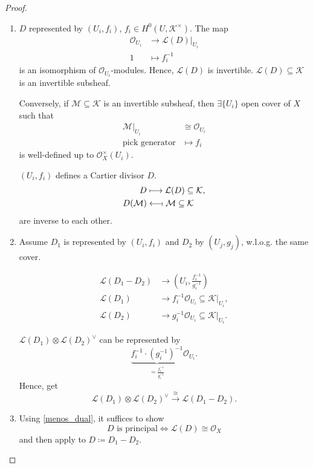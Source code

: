 \documentclass[12pt]{article}
\theoremstyle{definition}
\begin{document}
\begin{proof}
\begin{enumerate}[label=\roman*)]
\item $D$ represented by $(U_i,f_i)$, $f_i\in H^0(U,\mathcal K^\times)$. The map
\begin{align*}
\mathcal O_{U_i}&\longrightarrow\mathcal L(D)|_{U_i}\\1&\longmapsto f_i^{-1}
\end{align*}
is an isomorphism of $\mathcal O_{U_i}$-modules. Hence, $\mathcal L(D)$ is invertible. $\mathcal L(D)\subseteq\mathcal K$ is an invertible subsheaf.

Conversely, if $\mathcal M\subseteq\mathcal K$ is an invertible subsheaf, then $\exists\{U_i\}$ open cover of $X$ such that
\begin{align*}
\mathcal M|_{U_i}&\cong\mathcal O_{U_i}\\\text{pick generator}&\mapsto f_i
\end{align*}
is well-defined up to $\mathcal O_X^\times(U_i)$.

$(U_i,f_i)$ defines a Cartier divisor $D$.
\begin{align*}
D&\longmapsto\mathcal L(D)\subseteq\mathcal K,\\D(\mathcal M)&\longleftarrow\!\shortmid\mathcal M\subseteq\mathcal K
\end{align*}
are inverse to each other.

\item Assume $D_1$ is represented by $(U_i,f_i)$ and $D_2$ by $(U_j,g_j)$, w.l.o.g. the same cover.

\begin{align*}
\mathcal L(D_1-D_2)&\longrightarrow\left(U_i,\frac{f_i^{-1}}{g_i^{-1}}\right)\\\mathcal L(D_1)&\longrightarrow f_i^{-1}\mathcal O_{U_i}\subseteq\mathcal K|_{U_i},\\\mathcal L(D_2)&\longrightarrow g_i^{-1}\mathcal O_{U_i}\subseteq\mathcal K|_{U_i}.
\end{align*}

$\mathcal L(D_1)\otimes\mathcal L(D_2)^\vee$ can be represented by
\[\underbrace{f_i^{-1}\cdot(g_i^{-1})^{-1}}_{=\frac{f_i^{-1}}{g_i^{-1}}}\mathcal O_{U_i}.\]
Hence, get
\[\mathcal L(D_1)\otimes\mathcal L(D_2)^\vee\overset\cong\longrightarrow\mathcal L(D_1-D_2).\]

\item Using \ref{menos_dual}, it suffices to show
\[D\text{ is principal}\Longleftrightarrow\mathcal L(D)\cong\mathcal O_X\]
and then apply to $D\coloneqq D_1-D_2$.


\end{enumerate}
\end{proof}
\end{document}
